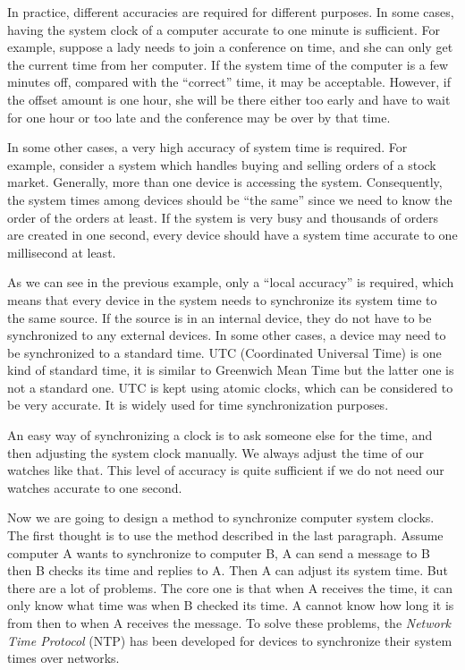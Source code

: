 In practice, different accuracies are required for different purposes. 
In some cases, having the system clock of a computer accurate to one
minute is sufficient. For example, suppose a lady needs to join a conference on
time, and she can only get the current time from her computer. If the system
time of the computer is a few minutes off, compared with the ``correct'' time,
it may be acceptable. However, if the offset amount is one hour, she will be
there either too early and have to wait for one hour or too late and the
conference may be over by that time.

In some other cases, a very high accuracy of system time is required. For
example, consider a system which handles buying and selling orders of a stock
market.  Generally, more than one device is accessing the system. Consequently,
the system times among devices should be ``the same'' since we need to know the
order of the orders at least. If the system is very busy and thousands of
orders are created in one second, every device should have a system time
accurate to one millisecond at least.

As we can see in the previous example, only a ``local accuracy'' is required,
which means that every device in the system needs to synchronize its system
time to the same source. If the source is in an internal device, they do not
have to be synchronized to any external devices. In some other cases, a device
may need to be synchronized to a standard time. 
UTC (Coordinated Universal Time) is one kind of standard time, it is similar 
to Greenwich Mean Time but the latter one is not a standard one. UTC is kept
using atomic clocks, which can be considered to be very accurate. It is widely
used for time synchronization purposes.

An easy way of synchronizing a clock is to ask someone else for the time, and
then adjusting the system clock manually. We always adjust the time of our
watches like that. This level of accuracy is quite sufficient if we do not need
our watches accurate to one second. 

Now we are going to design a method to synchronize computer system clocks. The
first thought is to use the method described in the last paragraph. Assume
computer A wants to synchronize to computer B, A can send a message to B then B
checks its time and replies to A\null. Then A can adjust its system time.  
But there are a lot of problems.  The core one is that when A receives
the time, it can only know what time was when B checked its time. A cannot know
how long it is from then to when A receives the message. To solve these
problems, the \emph{Network Time Protocol} (NTP) has been developed for devices
to synchronize their system times over networks. 

